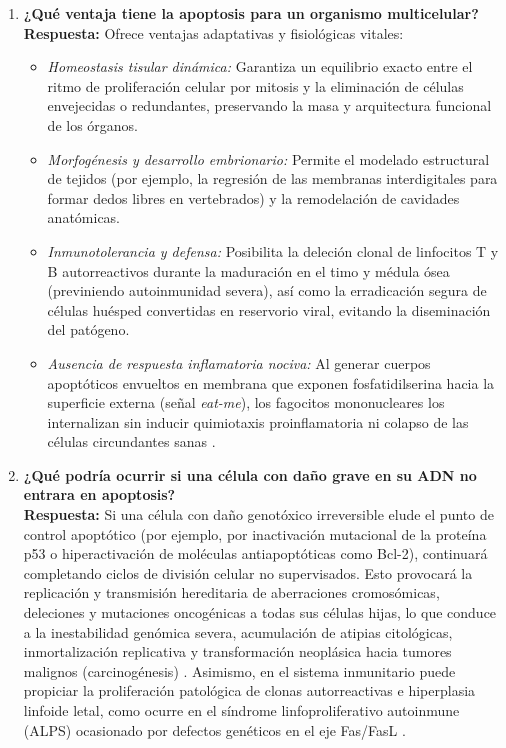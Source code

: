 \documentclass[spanish,letterpaper,oneside]{article}
\begin{document}
\begin{enumerate}[label=\textbf{\arabic*.}]
	\item \textbf{¿Qué ventaja tiene la apoptosis para un organismo multicelular?}\\
	\textbf{Respuesta:} Ofrece ventajas adaptativas y fisiológicas vitales:
	\begin{itemize}[leftmargin=1.5em,itemsep=0.15em]
		\item \emph{Homeostasis tisular dinámica:} Garantiza un equilibrio exacto entre el ritmo de proliferación celular por mitosis y la eliminación de células envejecidas o redundantes, preservando la masa y arquitectura funcional de los órganos.
		\item \emph{Morfogénesis y desarrollo embrionario:} Permite el modelado estructural de tejidos (por ejemplo, la regresión de las membranas interdigitales para formar dedos libres en vertebrados) y la remodelación de cavidades anatómicas.
		\item \emph{Inmunotolerancia y defensa:} Posibilita la deleción clonal de linfocitos T y B autorreactivos durante la maduración en el timo y médula ósea (previniendo autoinmunidad severa), así como la erradicación segura de células huésped convertidas en reservorio viral, evitando la diseminación del patógeno.
		\item \emph{Ausencia de respuesta inflamatoria nociva:} Al generar cuerpos apoptóticos envueltos en membrana que exponen fosfatidilserina hacia la superficie externa (señal \emph{eat-me}), los fagocitos mononucleares los internalizan sin inducir quimiotaxis proinflamatoria ni colapso de las células circundantes sanas \parencite{caulfield2014disruption,abbas2022cellular}.
	\end{itemize}

	\item \textbf{¿Qué podría ocurrir si una célula con daño grave en su ADN no entrara en apoptosis?}\\
	\textbf{Respuesta:} Si una célula con daño genotóxico irreversible elude el punto de control apoptótico (por ejemplo, por inactivación mutacional de la proteína p53 o hiperactivación de moléculas antiapoptóticas como Bcl-2), continuará completando ciclos de división celular no supervisados. Esto provocará la replicación y transmisión hereditaria de aberraciones cromosómicas, deleciones y mutaciones oncogénicas a todas sus células hijas, lo que conduce a la inestabilidad genómica severa, acumulación de atipias citológicas, inmortalización replicativa y transformación neoplásica hacia tumores malignos (carcinogénesis) \parencite{lodish2021molecular,guegan2022fas}. Asimismo, en el sistema inmunitario puede propiciar la proliferación patológica de clonas autorreactivas e hiperplasia linfoide letal, como ocurre en el síndrome linfoproliferativo autoinmune (ALPS) ocasionado por defectos genéticos en el eje Fas/FasL \parencite{strasser2009many}.


\end{enumerate}
\end{document}
